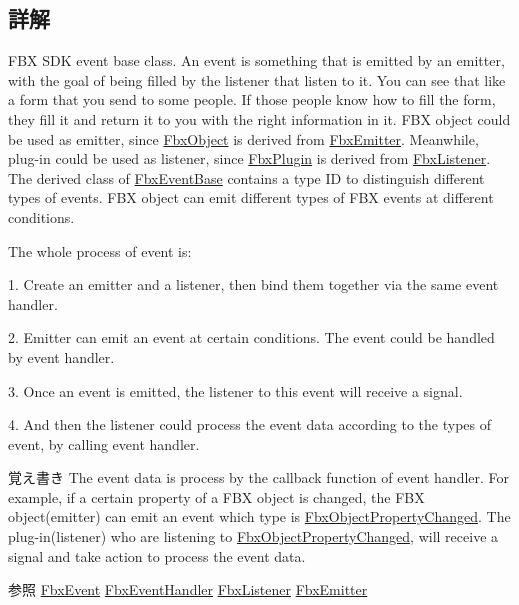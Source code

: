 \subsection{詳解}
F\+BX S\+DK event base class. An event is something that is emitted by an emitter, with the goal of being filled by the listener that listen to it. You can see that like a form that you send to some people. If those people know how to fill the form, they fill it and return it to you with the right information in it. F\+BX object could be used as emitter, since \hyperlink{class_fbx_object}{Fbx\+Object} is derived from \hyperlink{class_fbx_emitter}{Fbx\+Emitter}. Meanwhile, plug-\/in could be used as listener, since \hyperlink{class_fbx_plugin}{Fbx\+Plugin} is derived from \hyperlink{class_fbx_listener}{Fbx\+Listener}. The derived class of \hyperlink{class_fbx_event_base}{Fbx\+Event\+Base} contains a type ID to distinguish different types of events. F\+BX object can emit different types of F\+BX events at different conditions. \begin{DoxyParagraph}{The whole process of event is\+:}
\begin{DoxyItemize}
\item 1. Create an emitter and a listener, then bind them together via the same event handler. \item 2. Emitter can emit an event at certain conditions. The event could be handled by event handler. \item 3. Once an event is emitted, the listener to this event will receive a signal. \item 4. And then the listener could process the event data according to the types of event, by calling event handler. \end{DoxyItemize}

\end{DoxyParagraph}
\begin{DoxyNote}{覚え書き}
The event data is process by the callback function of event handler. For example, if a certain property of a F\+BX object is changed, the F\+BX object(emitter) can emit an event which type is \hyperlink{class_fbx_object_property_changed}{Fbx\+Object\+Property\+Changed}. The plug-\/in(listener) who are listening to \hyperlink{class_fbx_object_property_changed}{Fbx\+Object\+Property\+Changed}, will receive a signal and take action to process the event data.
\end{DoxyNote}
\begin{DoxySeeAlso}{参照}
\hyperlink{class_fbx_event}{Fbx\+Event} \hyperlink{class_fbx_event_handler}{Fbx\+Event\+Handler} \hyperlink{class_fbx_listener}{Fbx\+Listener} \hyperlink{class_fbx_emitter}{Fbx\+Emitter} 
\end{DoxySeeAlso}


